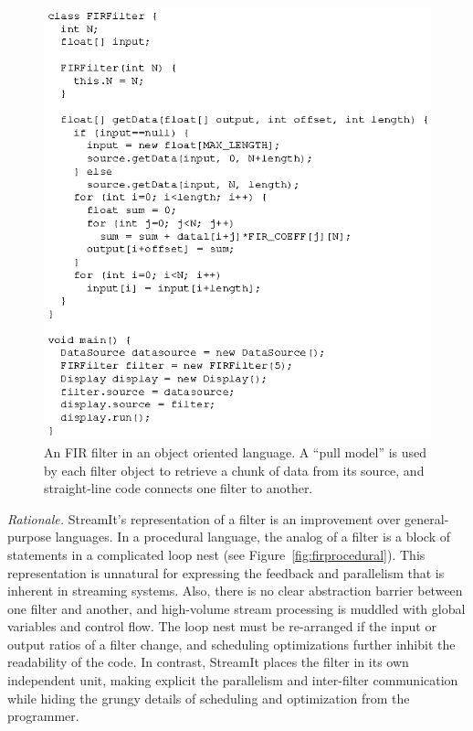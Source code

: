 \begin{figure}
\centering
\includegraphics{fir-object.eps}
\caption{An FIR filter in an object oriented language.  A ``pull
  model'' is used by each filter object to retrieve a chunk of data
  from its source, and straight-line code connects one filter to
  another.}
\label{fig:firobject}
\end{figure}

\label{sec:oo-rat}
\emph{Rationale.}  StreamIt's representation of a filter is an
improvement over general-purpose languages.  In a procedural language,
the analog of a filter is  a block of statements in a complicated loop
nest  (see   Figure~\ref{fig:firprocedural}).   This  representation  is
unnatural for expressing the feedback and parallelism that is inherent
in  streaming systems.  Also,  there is  no clear  abstraction barrier
between one  filter and another, and high-volume  stream processing is
muddled with global variables and control flow.  The loop nest must be
re-arranged if  the input  or output ratios  of a filter  change, and
scheduling optimizations further inhibit  the readability of the code.
In contrast, StreamIt  places the filter in its  own independent unit,
making explicit  the parallelism and  inter-filter communication while
hiding  the grungy  details of  scheduling and  optimization  from the
programmer.

